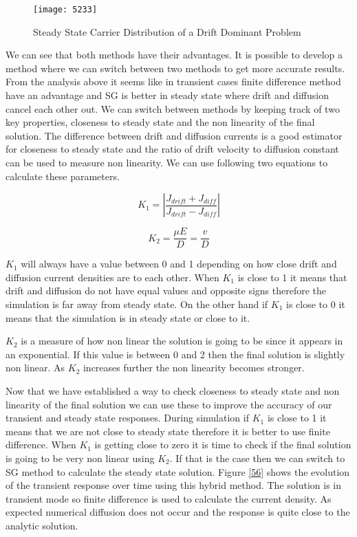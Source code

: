 \begin{figure}[!htp]
\centering
\texttt{[image: 5233]}
\caption{Steady State Carrier Distribution of a Drift Dominant Problem} 
\label{55}
\end{figure}

We can see that both methods have their advantages. It is possible to develop a method where we can switch between two methods to get more accurate results. From the analysis above it seems like in transient cases finite difference method have an advantage and SG is better in steady state where drift and diffusion cancel each other out. We can switch between methods by keeping track of two key properties, closeness to steady state and the non linearity of the final solution. The difference between drift and diffusion currents is a good estimator for closeness to steady state and the ratio of drift velocity to diffusion constant can be used to measure non linearity. We can use following two equations to calculate these parameters.

\begin{equation}
K_1=|\frac{J_{drift}+J_{diff}}{J_{drift}-J_{diff}}|
\end{equation}

\begin{equation}
K_2=\frac{\mu E}{D}=\frac{v}{D}
\end{equation}

$K_1$ will always have a value between 0 and 1 depending on how close drift and diffusion current densities are to each other. When $K_1$ is close to 1 it means that drift and diffusion do not have equal values and opposite signs therefore the simulation is far away from steady state. On the other hand if $K_1$ is close to 0 it means that the simulation is in steady state or close to it.  

$K_2$ is a measure of how non linear the solution is going to be since it appears in an exponential. If this value is between 0 and 2 then the final solution is slightly non linear. As $K_2$ increases further the non linearity becomes stronger.

Now that we have established a way to check closeness to steady state and non linearity of the final solution we can use these to improve the accuracy of our transient and steady state responses. During simulation if $K_1$ is close to 1 it means that we are not close to steady state therefore it is better to use finite difference. When $K_1$ is getting close to zero it is time to check if the final solution is going to be very non linear using $K_2$. If that is the case then we can switch to SG method to calculate the steady state solution. Figure \ref{56} shows the evolution of the transient response over time using this hybrid method. The solution is in transient mode so finite difference is used to calculate the current density. As expected numerical diffusion does not occur and the response is quite close to the analytic solution.

